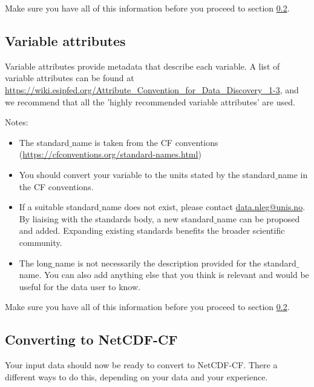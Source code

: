 \documentclass[a4paper,english, 11pt]{article}
\makeatletter
\newcommand{\emailme}{\href{mailto:data.nleg@unis.no}{data.nleg@unis.no}}
\makeatother
\begin{document}
Make sure you have all of this information before you proceed to section \ref{ss:convertingnetcdf}.

\subsection{Variable attributes}
\label{ss:variableattributes}

Variable attributes provide metadata that describe each variable. A list of variable attributes can be found at \url{https://wiki.esipfed.org/Attribute_Convention_for_Data_Discovery_1-3}, and we recommend that all the 'highly recommended variable attributes' are used.

Notes:
\begin{itemize}
\item The standard$\_$name is taken from the CF conventions (\url{https://cfconventions.org/standard-names.html})
\item You should convert your variable to the units stated by the standard$\_$name in the CF conventions.
\item If a suitable standard$\_$name does not exist, please contact \emailme . By liaising with the standards body, a new standard$\_$name can be proposed and added. Expanding existing standards benefits the broader scientific community.
\item The long$\_$name is not necessarily the description provided for the standard$\_$name. You can also add anything else that you think is relevant and would be useful for the data user to know.  
\end{itemize}

Make sure you have all of this information before you proceed to section \ref{ss:convertingnetcdf}.

\subsection{Converting to NetCDF-CF}
\label{ss:convertingnetcdf}

Your input data should now be ready to convert to NetCDF-CF. There a different ways to do this, depending on your data and your experience.
\end{document}
